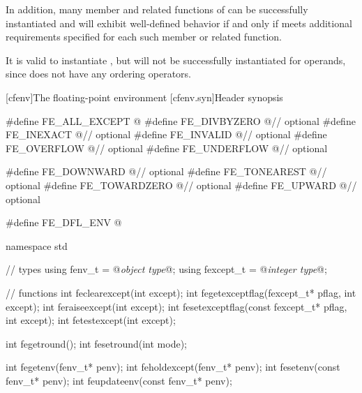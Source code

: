\pnum
In addition, many member and related functions of
can be successfully instantiated
and will exhibit well-defined behavior if and only if
 meets additional requirements specified for each such member
or related function.

\pnum
\begin{example}
It is valid to instantiate
,
but
will not be successfully instantiated for
operands, since
does not have any ordering operators.
\end{example}

[cfenv]{The floating-point environment}
[cfenv.syn]{Header  synopsis}
%

%
%
%
%
%
%
%
%
%
%
%
%
%
%
%
%
%
%
%
%
%
%
%
%
\begin{codeblock}
#define FE_ALL_EXCEPT @\seebelow@
#define FE_DIVBYZERO @\seebelow@    // optional
#define FE_INEXACT @\seebelow@      // optional
#define FE_INVALID @\seebelow@      // optional
#define FE_OVERFLOW @\seebelow@     // optional
#define FE_UNDERFLOW @\seebelow@    // optional

#define FE_DOWNWARD @\seebelow@     // optional
#define FE_TONEAREST @\seebelow@    // optional
#define FE_TOWARDZERO @\seebelow@   // optional
#define FE_UPWARD @\seebelow@       // optional

#define FE_DFL_ENV @\seebelow@

namespace std {
  // types
  using fenv_t    = @\textit{object type}@;
  using fexcept_t = @\textit{integer type}@;

  // functions
  int feclearexcept(int except);
  int fegetexceptflag(fexcept_t* pflag, int except);
  int feraiseexcept(int except);
  int fesetexceptflag(const fexcept_t* pflag, int except);
  int fetestexcept(int except);

  int fegetround();
  int fesetround(int mode);

  int fegetenv(fenv_t* penv);
  int feholdexcept(fenv_t* penv);
  int fesetenv(const fenv_t* penv);
  int feupdateenv(const fenv_t* penv);
}
\end{codeblock}

